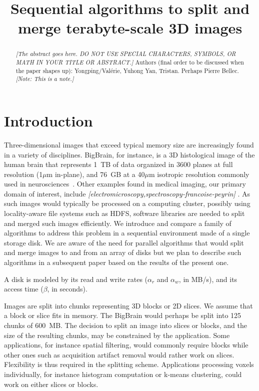 \documentclass[10pt, conference, compsocconf]{IEEEtran}
\newcommand{\todo}[1]{
  \color{red}\emph{[#1]}
  \color{black}
}
\newcommand{\note}[1]{
  \color{blue}\emph{[Note: #1]}
  \color{black}
}
\begin{document}
\title{Sequential algorithms to split and merge terabyte-scale 3D images}

\maketitle

\begin{abstract}
  \todo{The abstract goes here. DO NOT USE SPECIAL CHARACTERS,
    SYMBOLS, OR MATH IN YOUR TITLE OR ABSTRACT.}  Authors (final order
  to be discussed when the paper shapes up): Yongping/Val\'erie,
  Yuhong Yan, Tristan. Perhaps Pierre Bellec. \note{This is a note.}
\end{abstract}


\section{Introduction}

Three-dimensional images that exceed typical memory size are
increasingly found in a variety of disciplines. BigBrain, for
instance, is a 3D histological image of the human brain that
represents 1~TB of data organized in 3600 planes at full resolution
(1$\mu$m in-plane), and 76~GB at a 40$\mu$m isotropic resolution
commonly used in neurosciences~\cite{amunts2013bigbrain}. Other
examples found in medical imaging, our primary domain of interest,
include \todo{electromicroscopy,spectroscopy-francoise-peyrin}. As
such images would typically be processed on a computing cluster,
possibly using locality-aware file systems such as HDFS, software
libraries are needed to split and merged such images efficiently. We
introduce and compare a family of algorithms to address this problem
in a sequential environment made of a single storage disk. We are
aware of the need for parallel algorithms that would split and merge
images to and from an array of disks but we plan to describe such
algorithms in a subsequent paper based on the results of the present
one.

A disk is modeled by its read and write rates ($\alpha_r$ and
$\alpha_w$, in MB/s), and its access time ($\beta$, in seconds).

Images are split into chunks representing 3D blocks or 2D slices. We
assume that a block or slice fits in memory. The BigBrain would
perhaps be split into 125 chunks of 600~MB. The decision to split an
image into slices or blocks, and the size of the resulting chunks, may
be constrained by the application. Some applications, for instance
spatial filtering, would commonly require blocks while other ones such
as acquisition artifact removal would rather work on
slices. Flexibility is thus required in the splitting
scheme. Applications processing voxels individually, for instance
histogram computation or k-means clustering, could work on either
slices or blocks.
\end{document}
